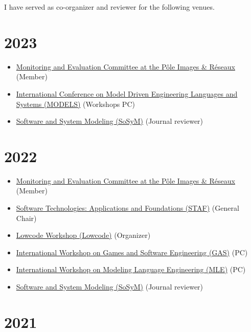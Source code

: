 I have served as co-organizer and reviewer for the following venues.

\hypertarget{section}{%
\section{2023}\label{section}}

\begin{itemize}
\tightlist
\item
  \href{http://www.images-et-reseaux.com/en}{Monitoring and Evaluation
  Committee at the Pôle Images \& Réseaux} (Member)
\item
  \href{https://modelsconference.org/}{International Conference on Model
  Driven Engineering Languages and Systems (MODELS)} (Workshops PC)
\item
  \href{http://www.sosym.org/}{Software and System Modeling (SoSyM)}
  (Journal reviewer)
\end{itemize}

\hypertarget{section-1}{%
\section{2022}\label{section-1}}

\begin{itemize}
\tightlist
\item
  \href{http://www.images-et-reseaux.com/en}{Monitoring and Evaluation
  Committee at the Pôle Images \& Réseaux} (Member)
\item
  \href{https://staf2022.univ-nantes.io/}{Software Technologies:
  Applications and Foundations (STAF)} (General Chair)
\item
  \href{https://lowcode-workshop.github.io/}{Lowcode Workshop (Lowcode)}
  (Organizer)
\item
  \href{https://conf.researchr.org/home/icse-2022/gas-2022}{International
  Workshop on Games and Software Engineering (GAS)} (PC)
\item
  \href{https://mleworkshop.github.io/editions/mle2022/}{International
  Workshop on Modeling Language Engineering (MLE)} (PC)
\item
  \href{http://www.sosym.org/}{Software and System Modeling (SoSyM)}
  (Journal reviewer)
\end{itemize}

\hypertarget{section-2}{%
\section{2021}\label{section-2}}

